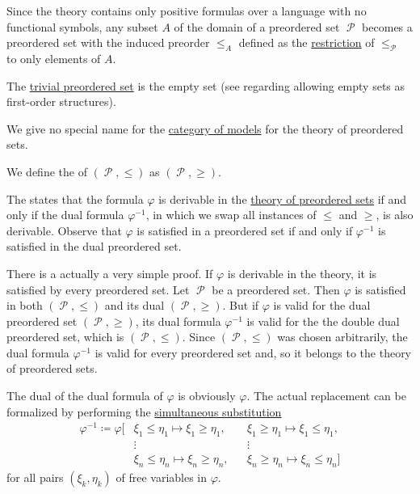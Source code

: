 \begin{definition}
\begin{thmenum}
     Since the theory contains only positive formulas over a language with no functional symbols, any subset \( A \) of the domain of a preordered set \( \mscrP \) becomes a preordered set with the induced preorder \( \leq_A \) defined as the \hyperref[def:binary_relation/restriction]{restriction} of \( \leq_\mscrP \) to only elements of \( A \).

     The \hyperref[thm:substructures_form_complete_lattice/bottom]{trivial preordered set} is the empty set (see  regarding allowing empty sets as first-order structures).

     We give no special name for the \hyperref[def:category_of_first_order_models]{category of models} for the theory of preordered sets.

     We define the  of \( (\mscrP, \leq) \) as \( (\mscrP, \geq) \).

    The  states that the formula \( \varphi \) is derivable in the \hyperref[def:preordered_set/theory]{theory of preordered sets} if and only if the dual formula \( \varphi^{-1} \), in which we swap all instances of \( \leq \) and \( \geq \), is also derivable. Observe that \( \varphi \) is satisfied in a preordered set if and only if \( \varphi^{-1} \) is satisfied in the dual preordered set.

    There is a actually a very simple proof. If \( \varphi \) is derivable in the theory, it is satisfied by every preordered set. Let \( \mscrP \) be a preordered set. Then \( \varphi \) is satisfied in both \( (\mscrP, \leq) \) and its dual \( (\mscrP, \geq) \). But if \( \varphi \) is valid for the dual preordered set \( (\mscrP, \geq) \), its dual formula \( \varphi^{-1} \) is valid for the the double dual preordered set, which is \( (\mscrP, \leq) \). Since \( (\mscrP, \leq) \) was chosen arbitrarily, the dual formula \( \varphi^{-1} \) is valid for every preordered set and, so it belongs to the theory of preordered sets.

    The dual of the dual formula of \( \varphi \) is obviously \( \varphi \). The actual replacement can be formalized by performing the \hyperref[def:first_order_substitution/term_in_formula]{simultaneous substitution}
    \begin{equation*}
      \begin{aligned}
        \varphi^{-1} \coloneqq \varphi[
          &\xi_1 \leq \eta_1 \mapsto \xi_1 \geq \eta_1, &&\xi_1 \geq \eta_1 \mapsto \xi_1 \leq \eta_1, \\
          &\vdots                                       &&\vdots \\
          &\xi_n \leq \eta_n \mapsto \xi_n \geq \eta_n, &&\xi_n \geq \eta_n \mapsto \xi_n \leq \eta_n]
      \end{aligned}
    \end{equation*}
    for all pairs \( (\xi_k, \eta_k) \) of free variables in \( \varphi \).


\end{thmenum}
\end{definition}

